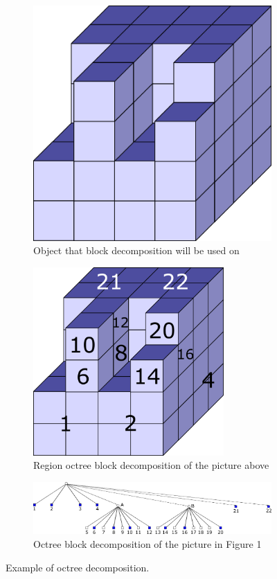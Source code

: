 \begin{figure}
\centering
\begin{subfigure}[t]{.48\textwidth}
 \centering
 \includegraphics[width=.8\linewidth]{mat3d_todo}
  \caption{Object that block decomposition will be used on}
  \label{fig:sub1}
\end{subfigure}%
\hfill%
\begin{subfigure}[t]{.48\textwidth}
 \centering
 \includegraphics[width=0.8\textwidth]{mat3d_todo_other2}
 \caption{Region octree block decomposition of the picture above}
\end{subfigure}

\vspace{10px}
\begin{subfigure}{\textwidth}
\centering
\includegraphics[width=\textwidth]{mat3d_strom}
\caption{Octree block decomposition of the picture in Figure 1}
\end{subfigure}
\label{octree}
\caption{Example of octree decomposition.}
\end{figure}

